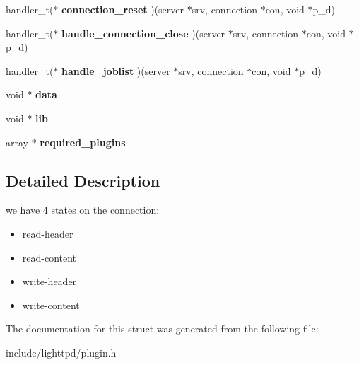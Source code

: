 \begin{CompactItemize}
\item 
\hypertarget{structplugin_5c3bbcff69dfdf5c591c0a420b38c055}{
handler\_\-t($\ast$ \textbf{connection\_\-reset} )(server $\ast$srv, connection $\ast$con, void $\ast$p\_\-d)}
\label{structplugin_5c3bbcff69dfdf5c591c0a420b38c055}

\item 
\hypertarget{structplugin_b59fbc651a4308ac4e89ed27d1d33a00}{
handler\_\-t($\ast$ \textbf{handle\_\-connection\_\-close} )(server $\ast$srv, connection $\ast$con, void $\ast$p\_\-d)}
\label{structplugin_b59fbc651a4308ac4e89ed27d1d33a00}

\item 
\hypertarget{structplugin_7d65846e47eeab07727ed3772d81e62b}{
handler\_\-t($\ast$ \textbf{handle\_\-joblist} )(server $\ast$srv, connection $\ast$con, void $\ast$p\_\-d)}
\label{structplugin_7d65846e47eeab07727ed3772d81e62b}

\item 
\hypertarget{structplugin_a5c0338878875f24bcaf3bb4e3f60bc6}{
void $\ast$ \textbf{data}}
\label{structplugin_a5c0338878875f24bcaf3bb4e3f60bc6}

\item 
\hypertarget{structplugin_b8a4a02c20d1fa7be51580e5c7584998}{
void $\ast$ \textbf{lib}}
\label{structplugin_b8a4a02c20d1fa7be51580e5c7584998}

\item 
\hypertarget{structplugin_bafa5fa5df2ab1a99454e7e56a5dbd61}{
array $\ast$ \textbf{required\_\-plugins}}
\label{structplugin_bafa5fa5df2ab1a99454e7e56a5dbd61}

\end{CompactItemize}


\subsection{Detailed Description}
we have 4 states on the connection:\begin{itemize}
\item read-header\item read-content\item write-header\item write-content \end{itemize}


The documentation for this struct was generated from the following file:\begin{CompactItemize}
\item 
include/lighttpd/plugin.h\end{CompactItemize}
